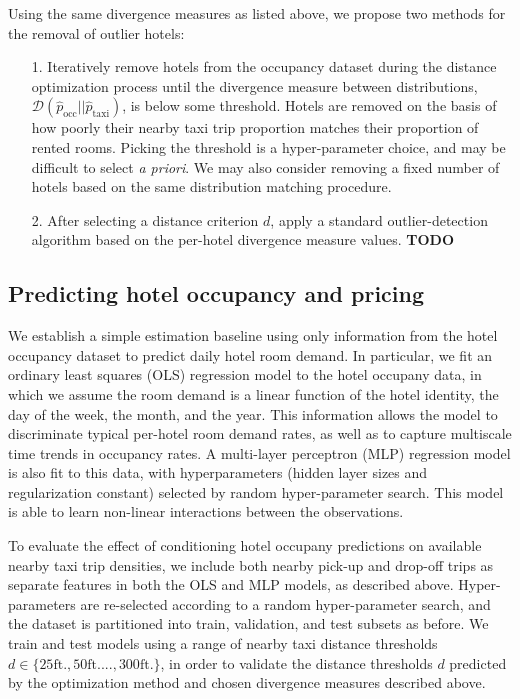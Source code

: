\documentclass[useAMS, referee, usenatbib]{biom}
\begin{document}
Using the same divergence measures as listed above, we propose two methods for the removal of outlier hotels:

\begin{itemize}

\item [1.] Iteratively remove hotels from the occupancy dataset during the distance optimization process until the divergence measure between distributions, $\mathcal{D} (\hat{p}_{\mathrm{occ}} || \hat{p}_{\mathrm{taxi}})$, is below some threshold. Hotels are removed on the basis of how poorly their nearby taxi trip proportion matches their proportion of rented rooms. Picking the threshold is a hyper-parameter choice, and may be difficult to select \textit{a priori}. We may also consider removing a fixed number of hotels based on the same distribution matching procedure.

\item [2.] After selecting a distance criterion $d$, apply a standard outlier-detection algorithm based on the per-hotel divergence measure values. \textbf{TODO}

\end{itemize}

\subsection{Predicting hotel occupancy and pricing}

We establish a simple estimation baseline using only information from the hotel occupancy dataset to predict daily hotel room demand. In particular, we fit an ordinary least squares (OLS) regression model to the hotel occupany data, in which we assume the room demand is a linear function of the hotel identity, the day of the week, the month, and the year. This information allows the model to discriminate typical per-hotel room demand rates, as well as to capture multiscale time trends in occupancy rates. A multi-layer perceptron (MLP) regression model is also fit to this data, with hyperparameters (hidden layer sizes and regularization constant) selected by random hyper-parameter search. This model is able to learn non-linear interactions between the observations.

To evaluate the effect of conditioning hotel occupany predictions on available nearby taxi trip densities, we include both nearby pick-up and drop-off trips as separate features in both the OLS and MLP models, as described above. Hyper-parameters are re-selected according to a random hyper-parameter search, and the dataset is partitioned into train, validation, and test subsets as before. We train and test models using a range of nearby taxi distance thresholds $d \in \{25 \mathrm{ft.}, 50 \mathrm{ft.} ..., 300 \mathrm{ft.} \}$, in order to validate the distance thresholds $d$ predicted by the optimization method and chosen divergence measures described above.
\end{document}
